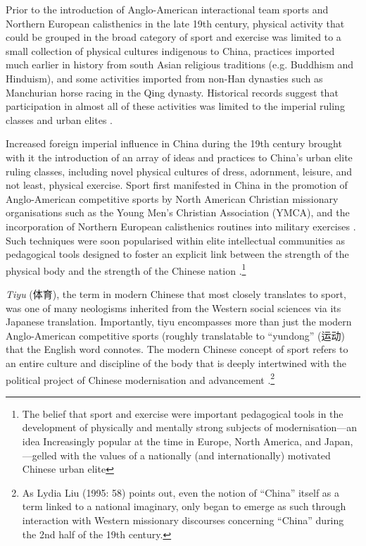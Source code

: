 \begin{CJK}{UTF8}{gbsn}
Prior to the introduction of Anglo-American interactional team sports and Northern European calisthenics in the late 19th century, physical activity that could be grouped in the broad category of sport and exercise was limited to a small collection of physical cultures indigenous to China, practices imported much earlier in history from south Asian religious traditions (e.g. Buddhism and Hinduism), and some activities imported from non-Han dynasties such as Manchurian horse racing in the Qing dynasty.  Historical records suggest that participation in almost all of these activities was limited to the imperial ruling classes and urban elites \citep{Ge2005}.

Increased foreign imperial influence in China during the 19th century brought with it the introduction of an array of ideas and practices to China's urban elite ruling classes, including novel physical cultures of dress, adornment, leisure, and not least, physical exercise.  Sport first manifested in China in the promotion of Anglo-American competitive sports by North American Christian missionary organisations such as the Young Men’s Christian Association (YMCA), and the incorporation of Northern European calisthenics routines into military exercises \citep[240]{Morris2004}.  Such techniques were soon popularised within elite intellectual communities as pedagogical tools designed to foster an explicit link between the strength of the physical body and the strength of the Chinese nation \cites[32]{Morris2004}[49]{Brownell1995}.\footnote{The belief that sport and exercise were important pedagogical tools in the development of physically and mentally strong subjects of modernisation---an idea Increasingly popular at the time in Europe, North America, and Japan, \citep{Elias1986}---gelled with the values of a nationally (and internationally) motivated Chinese urban elite}

\textit{Tiyu} (体育), the term in modern Chinese that most closely translates to sport, was one of many neologisms inherited from the Western social sciences via its Japanese translation.  Importantly, tiyu encompasses more than just the modern Anglo-American competitive sports (roughly translatable to ``yundong'' (运动) that the English word connotes.  The modern Chinese concept of sport refers to an entire culture and discipline of the body that is deeply intertwined with the political project of Chinese modernisation and advancement \citep{Morris2004}.\footnote{As Lydia Liu (1995: 58) points out, even the notion of ``China'' itself as a term linked to a national imaginary, only began to emerge as such through interaction with Western missionary discourses concerning ``China'' during the 2nd half of the 19th century.}


\end{CJK}
